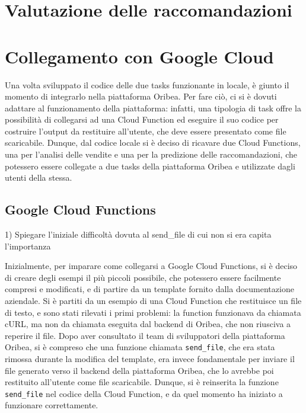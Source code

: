 \section{Valutazione delle raccomandazioni}

\section{Collegamento con Google Cloud}

Una volta sviluppato il codice delle due tasks funzionante in locale, è giunto il momento di integrarlo nella piattaforma Oribea.
Per fare ciò, ci si è dovuti adattare al funzionamento della piattaforma: infatti, una tipologia di task offre la possibilità di collegarsi ad una Cloud Function ed eseguire il suo codice per costruire l'output da restituire all'utente, che deve essere presentato come file scaricabile. Dunque, dal codice locale si è deciso di ricavare due Cloud Functions, una per l'analisi delle vendite e una per la predizione delle raccomandazioni, che potessero essere collegate a due tasks della piattaforma Oribea e utilizzate dagli utenti della stessa.

\subsection{Google Cloud Functions}

1) Spiegare l'iniziale difficoltà dovuta al send\_file di cui non si era capita l'importanza

Inizialmente, per imparare come collegarsi a Google Cloud Functions, si è deciso di creare degli esempi il più piccoli possibile, che potessero essere facilmente compresi e modificati, e di partire da un template fornito dalla documentazione aziendale. Si è partiti da un esempio di una Cloud Function che restituisce un file di testo, e sono stati rilevati i primi problemi: la function funzionava da chiamata cURL, ma non da chiamata eseguita dal backend di Oribea, che non riusciva a reperire il file. Dopo aver consultato il team di sviluppatori della piattaforma Oribea, si è compreso che una funzione chiamata \texttt{send\_file}, che era stata rimossa durante la modifica del template, era invece fondamentale per inviare il file generato verso il backend della piattaforma Oribea, che lo avrebbe poi restituito all'utente come file scaricabile. Dunque, si è reinserita la funzione \texttt{send\_file} nel codice della Cloud Function, e da quel momento ha iniziato a funzionare correttamente.

